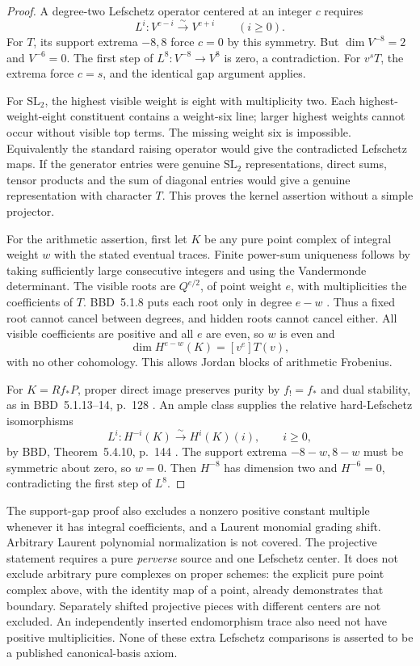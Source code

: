 \documentclass[11pt,a4paper]{article}
\theoremstyle{named}\newtheorem{finding}{Finding}[section]
\theoremstyle{definition}\newtheorem{definition}[finding]{Definition}
\theoremstyle{remark}\newtheorem{remark}[finding]{Remark}
\begin{document}
\begin{proof}
A degree-two Lefschetz operator centered at an
integer \(c\) requires
\[
                   L^i:V^{c-i}\xrightarrow{\sim}V^{c+i}
                         \qquad(i\ge0).
\]
For \(T\), its support extrema \(-8,8\)
force \(c=0\) by this symmetry.
But \(\dim V^{-8}=2\) and \(V^{-6}=0\).
The first step of \(L^8:V^{-8}\to V^8\)
is zero, a contradiction.
For \(v^sT\), the extrema force \(c=s\),
and the identical gap argument applies.

For \(\mathrm{SL}_2\), the highest visible
weight is eight with multiplicity two.
Each highest-weight-eight constituent contains
a weight-six line; larger highest weights
cannot occur without visible top terms.
The missing weight six is impossible.
Equivalently the standard raising operator
would give the contradicted Lefschetz maps.
If the generator entries were genuine
\(\mathrm{SL}_2\) representations, direct
sums, tensor products and the sum of diagonal
entries would give a genuine representation
with character \(T\). This proves the
kernel assertion without a simple projector.

For the arithmetic assertion, first let \(K\)
be any pure point complex of integral weight
\(w\) with the stated eventual traces.
Finite power-sum uniqueness follows by taking
sufficiently large consecutive integers and
using the Vandermonde determinant.
The visible roots are \(Q^{e/2}\), of point
weight \(e\), with multiplicities the
coefficients of \(T\).
BBD~5.1.8 puts each root only in degree
\(e-w\) \cite{BBD}.
Thus a fixed root cannot cancel between
degrees, and hidden roots cannot cancel either.
All visible coefficients are positive and all
\(e\) are even, so \(w\) is even and
\[
                 \dim H^{e-w}(K)=[v^e]T(v),
\]
with no other cohomology. This allows Jordan
blocks of arithmetic Frobenius.

For \(K=Rf_*P\), proper direct image
preserves purity by \(f_!=f_*\) and dual
stability, as in BBD~5.1.13--14, p.~128
\cite{BBD}.
An ample class supplies the relative
hard-Lefschetz isomorphisms
\[
          L^i:H^{-i}(K)\xrightarrow{\sim}H^i(K)(i),
                               \qquad i\ge0,
\]
by BBD, Theorem~5.4.10, p.~144 \cite{BBD}.
The support extrema \(-8-w,8-w\) must be
symmetric about zero, so \(w=0\).
Then \(H^{-8}\) has dimension two and
\(H^{-6}=0\), contradicting the first step
of \(L^8\).
\end{proof}

The support-gap proof also excludes a nonzero
positive constant multiple whenever it has
integral coefficients, and a Laurent monomial
grading shift. Arbitrary Laurent polynomial
normalization is not covered.
The projective statement requires a pure
\emph{perverse} source and one Lefschetz center.
It does not exclude arbitrary pure complexes
on proper schemes: the explicit pure point
complex above, with the identity map of a
point, already demonstrates that boundary.
Separately shifted projective pieces with
different centers are not excluded.
An independently inserted endomorphism trace
also need not have positive multiplicities.
None of these extra Lefschetz comparisons is
asserted to be a published canonical-basis axiom.
\end{document}

